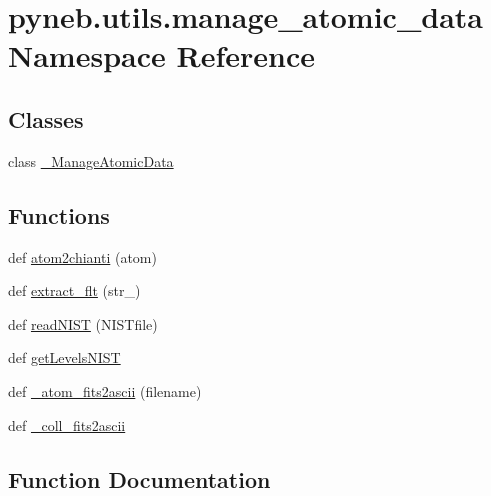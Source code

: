 \hypertarget{namespacepyneb_1_1utils_1_1manage__atomic__data}{}\section{pyneb.\+utils.\+manage\+\_\+atomic\+\_\+data Namespace Reference}
\label{namespacepyneb_1_1utils_1_1manage__atomic__data}
\subsection*{Classes}
\begin{DoxyCompactItemize}
\item 
class \hyperlink{classpyneb_1_1utils_1_1manage__atomic__data_1_1___manage_atomic_data}{\+\_\+\+Manage\+Atomic\+Data}
\end{DoxyCompactItemize}
\subsection*{Functions}
\begin{DoxyCompactItemize}
\item 
def \hyperlink{namespacepyneb_1_1utils_1_1manage__atomic__data_a9c992b2ae01f2e369be5d539172f78a0}{atom2chianti} (atom)
\item 
def \hyperlink{namespacepyneb_1_1utils_1_1manage__atomic__data_a211c531a869b2e0789e557b2a15a892c}{extract\+\_\+flt} (str\+\_\+)
\item 
def \hyperlink{namespacepyneb_1_1utils_1_1manage__atomic__data_ab843a6f51ebb888e83a849835e49a885}{read\+N\+I\+S\+T} (N\+I\+S\+Tfile)
\item 
def \hyperlink{namespacepyneb_1_1utils_1_1manage__atomic__data_ad09376e8676854d44680ae14210b5589}{get\+Levels\+N\+I\+S\+T}
\item 
def \hyperlink{namespacepyneb_1_1utils_1_1manage__atomic__data_a3e35c0ac9cfe657a18cb4a1a797edf32}{\+\_\+atom\+\_\+fits2ascii} (filename)
\item 
def \hyperlink{namespacepyneb_1_1utils_1_1manage__atomic__data_a1d70a5d8b876f114e058506cd9998de4}{\+\_\+coll\+\_\+fits2ascii}
\end{DoxyCompactItemize}


\subsection{Function Documentation}
\hypertarget{namespacepyneb_1_1utils_1_1manage__atomic__data_a3e35c0ac9cfe657a18cb4a1a797edf32}{}
